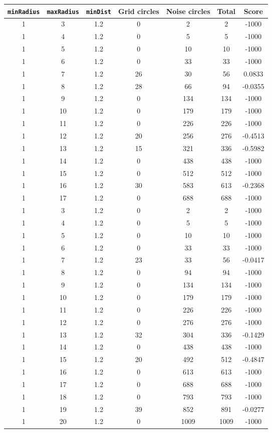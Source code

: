 \documentclass[letterpaper, 12pt]{article}
\begin{document}
\begin{longtable}{|c|c|c|c|c|c|c|}
\hline
\textbf{\texttt{minRadius}} & \textbf{\texttt{maxRadius}} & \textbf{\texttt{minDist}} & \textbf{Grid circles} & \textbf{Noise circles} & \textbf{Total} & \textbf{Score} \\
\hline
1 & 3 & 1.2 & 0 & 2 & 2 & -1000 \\
\hline
1 & 4 & 1.2 & 0 & 5 & 5 & -1000 \\
\hline
1 & 5 & 1.2 & 0 & 10 & 10 & -1000 \\
\hline
1 & 6 & 1.2 & 0 & 33 & 33 & -1000 \\
\hline
1 & 7 & 1.2 & 26 & 30 & 56 & 0.0833 \\
\hline
1 & 8 & 1.2 & 28 & 66 & 94 & -0.0355 \\
\hline
1 & 9 & 1.2 & 0 & 134 & 134 & -1000 \\
\hline
1 & 10 & 1.2 & 0 & 179 & 179 & -1000 \\
\hline
1 & 11 & 1.2 & 0 & 226 & 226 & -1000 \\
\hline
1 & 12 & 1.2 & 20 & 256 & 276 & -0.4513 \\
\hline
1 & 13 & 1.2 & 15 & 321 & 336 & -0.5982 \\
\hline
1 & 14 & 1.2 & 0 & 438 & 438 & -1000 \\
\hline
1 & 15 & 1.2 & 0 & 512 & 512 & -1000 \\
\hline
1 & 16 & 1.2 & 30 & 583 & 613 & -0.2368 \\
\hline
1 & 17 & 1.2 & 0 & 688 & 688 & -1000 \\
\hline
1 & 3 & 1.2 & 0 & 2 & 2 & -1000 \\
\hline
1 & 4 & 1.2 & 0 & 5 & 5 & -1000 \\
\hline
1 & 5 & 1.2 & 0 & 10 & 10 & -1000 \\
\hline
1 & 6 & 1.2 & 0 & 33 & 33 & -1000 \\
\hline
1 & 7 & 1.2 & 23 & 33 & 56 & -0.0417 \\
\hline
1 & 8 & 1.2 & 0 & 94 & 94 & -1000 \\
\hline
1 & 9 & 1.2 & 0 & 134 & 134 & -1000 \\
\hline
1 & 10 & 1.2 & 0 & 179 & 179 & -1000 \\
\hline
1 & 11 & 1.2 & 0 & 226 & 226 & -1000 \\
\hline
1 & 12 & 1.2 & 0 & 276 & 276 & -1000 \\
\hline
1 & 13 & 1.2 & 32 & 304 & 336 & -0.1429 \\
\hline
1 & 14 & 1.2 & 0 & 438 & 438 & -1000 \\
\hline
1 & 15 & 1.2 & 20 & 492 & 512 & -0.4847 \\
\hline
1 & 16 & 1.2 & 0 & 613 & 613 & -1000 \\
\hline
1 & 17 & 1.2 & 0 & 688 & 688 & -1000 \\
\hline
1 & 18 & 1.2 & 0 & 793 & 793 & -1000 \\
\hline
1 & 19 & 1.2 & 39 & 852 & 891 & -0.0277 \\
\hline
1 & 20 & 1.2 & 0 & 1009 & 1009 & -1000 \\
\hline
\end{longtable}
\end{document}
